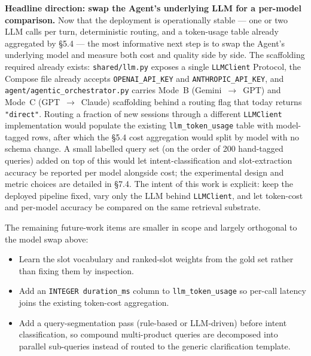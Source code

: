 \textbf{Headline direction: swap the Agent's underlying LLM for a per-model comparison.} Now that the deployment is operationally stable --- one or two LLM calls per turn, deterministic routing, and a token-usage table already aggregated by §5.4 --- the most informative next step is to swap the Agent's underlying model and measure both cost and quality side by side. The scaffolding required already exists: \texttt{shared/llm.py} exposes a single \texttt{LLMClient} Protocol, the Compose file already accepts \texttt{OPENAI\_API\_KEY} and \texttt{ANTHROPIC\_API\_KEY}, and \texttt{agent/agentic\_orchestrator.py} carries Mode~B (Gemini~$\rightarrow$~GPT) and Mode~C (GPT~$\rightarrow$~Claude) scaffolding behind a routing flag that today returns \texttt{"direct"}. Routing a fraction of new sessions through a different \texttt{LLMClient} implementation would populate the existing \texttt{llm\_token\_usage} table with model-tagged rows, after which the §5.4 cost aggregation would split by model with no schema change. A small labelled query set (on the order of 200 hand-tagged queries) added on top of this would let intent-classification and slot-extraction accuracy be reported per model alongside cost; the experimental design and metric choices are detailed in §7.4. The intent of this work is explicit: keep the deployed pipeline fixed, vary only the LLM behind \texttt{LLMClient}, and let token-cost and per-model accuracy be compared on the same retrieval substrate.

The remaining future-work items are smaller in scope and largely orthogonal to the model swap above:

\begin{itemize}
    \item Learn the slot vocabulary and ranked-slot weights from the gold set rather than fixing them by inspection.
    \item Add an \texttt{INTEGER duration\_ms} column to \texttt{llm\_token\_usage} so per-call latency joins the existing token-cost aggregation.
    \item Add a query-segmentation pass (rule-based or LLM-driven) before intent classification, so compound multi-product queries are decomposed into parallel sub-queries instead of routed to the generic clarification template.
\end{itemize}

